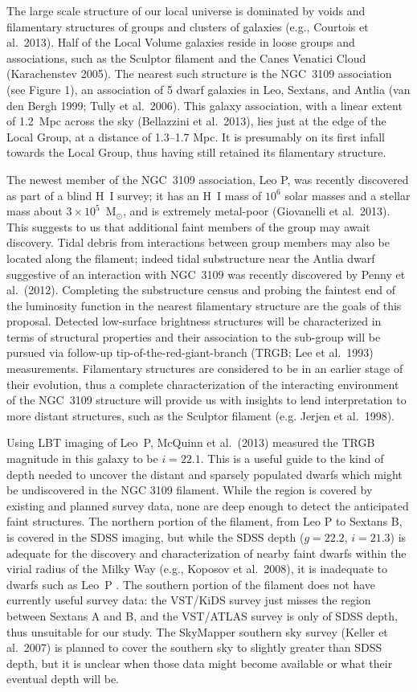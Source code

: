 The large scale structure of our local universe is dominated by voids and filamentary structures of groups and clusters of galaxies 
(e.g., Courtois et al.\ 2013).  Half of the Local Volume galaxies reside in loose groups and associations, such as the Sculptor filament and the Canes Venatici Cloud (Karachenstev 2005). The nearest such structure is the NGC~3109 association (see Figure 1), an association of 5 dwarf galaxies in Leo, Sextans, and Antlia (van den Bergh 1999; Tully et al.\ 2006). This galaxy association, with a linear extent of 1.2~Mpc across the sky (Bellazzini et al.\ 2013), lies just at the edge of the Local Group, at a distance of 1.3--1.7 Mpc. It is  presumably on its first infall towards the Local Group, thus having still retained its filamentary structure. 


The newest member of the NGC~3109 association, Leo P, was recently discovered as part of a blind H~I survey;
it has an H~I mass of $10^6$ solar masses and a stellar mass about $3\times10^5$~M$_{\odot}$, and is extremely metal-poor (Giovanelli et al.\ 2013).
This suggests to us that additional  faint members of the group may await discovery. Tidal debris from interactions between group members may also be located along the filament; indeed tidal substructure near the Antlia dwarf suggestive of an interaction with NGC~3109 was recently discovered by Penny et al.\ (2012). Completing the substructure census and probing the faintest end of the luminosity function in the nearest filamentary structure are the goals of this proposal. Detected low-surface brightness structures will be characterized in terms of structural properties and their association to the sub-group will be pursued via follow-up tip-of-the-red-giant-branch (TRGB; Lee et al.\ 1993) measurements. Filamentary structures are considered to be in an earlier stage of their evolution, thus a complete characterization of the interacting environment of the NGC~3109 structure will provide us with insights to lend interpretation to more distant structures, such as the Sculptor filament (e.g. Jerjen et al.\ 1998).

Using LBT imaging of Leo~P, McQuinn et al.\ (2013) measured the TRGB magnitude in this galaxy to be $i=22.1$. 
This is a useful guide to the kind of depth needed to uncover the distant and sparsely populated dwarfs which
might be undiscovered in the NGC 3109 filament. While the region is covered by existing  and planned
survey data, none are deep enough to detect the anticipated faint structures.
The northern portion of  the filament, from Leo P to  Sextans B, is covered in the SDSS imaging, but 
while the SDSS  depth ($g=22.2$, $i=21.3$) is adequate for the discovery and characterization of nearby faint dwarfs
within the virial radius of the Milky Way (e.g., Koposov et al.\ 2008), it is inadequate to  dwarfs such as Leo~P . 
The southern portion of the filament does not have currently useful survey data:
the VST/KiDS survey just misses  the region between Sextans A and B, and the VST/ATLAS survey is
only of SDSS depth,  thus unsuitable for our study. The SkyMapper southern sky survey (Keller et al.\ 2007) is planned 
to cover the southern sky to slightly greater than SDSS depth, but it is unclear when those data might become available
or what their eventual depth will be.

